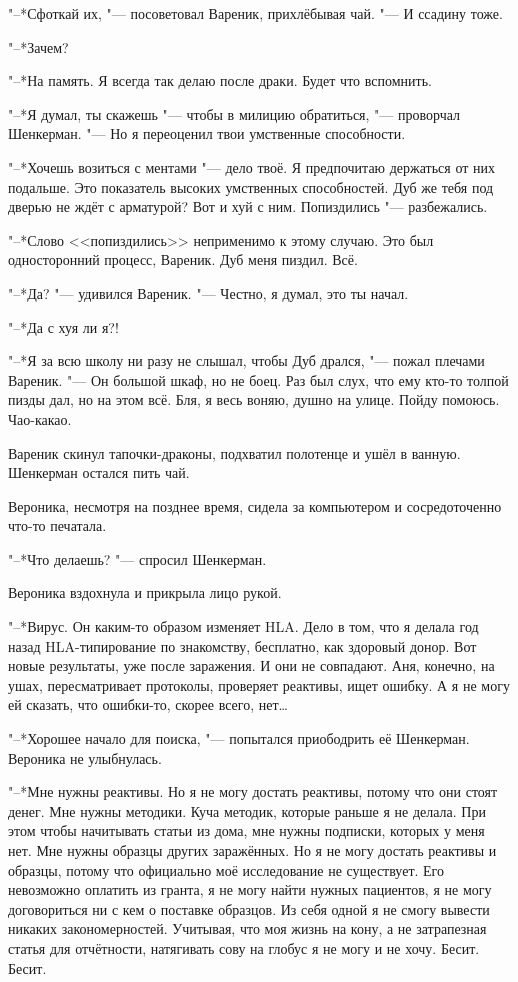 "--*Сфоткай их, "--- посоветовал Вареник, прихлёбывая чай.
"--- И ссадину тоже.

"--*Зачем?

"--*На память.
Я всегда так делаю после драки.
Будет что вспомнить.

"--*Я думал, ты скажешь "--- чтобы в милицию обратиться, "--- проворчал Шенкерман.
"--- Но я переоценил твои умственные способности.

"--*Хочешь возиться с ментами "--- дело твоё.
Я предпочитаю держаться от них подальше.
Это показатель высоких умственных способностей.
Дуб же тебя под дверью не ждёт с арматурой?
Вот и хуй с ним.
Попиздились "--- разбежались.

"--*Слово <<попиздились>> неприменимо к этому случаю.
Это был односторонний процесс, Вареник.
Дуб меня пиздил.
Всё.

"--*Да? "--- удивился Вареник.
"--- Честно, я думал, это ты начал.

"--*Да с хуя ли я?!

"--*Я за всю школу ни разу не слышал, чтобы Дуб дрался, "--- пожал плечами Вареник.
"--- Он большой шкаф, но не боец.
Раз был слух, что ему кто-то толпой пизды дал, но на этом всё.
Бля, я весь воняю, душно на улице.
Пойду помоюсь.
Чао-какао.

Вареник скинул тапочки-драконы, подхватил полотенце и ушёл в ванную.
Шенкерман остался пить чай.

Вероника, несмотря на позднее время, сидела за компьютером и сосредоточенно что-то печатала.

"--*Что делаешь? "--- спросил Шенкерман.

Вероника вздохнула и прикрыла лицо рукой.

"--*Вирус.
Он каким-то образом изменяет HLA.
Дело в том, что я делала год назад HLA-типирование по знакомству, бесплатно, как здоровый донор.
Вот новые результаты, уже после заражения.
И они не совпадают.
Аня, конечно, на ушах, пересматривает протоколы, проверяет реактивы, ищет ошибку.
А я не могу ей сказать, что ошибки-то, скорее всего, нет\ldots{}

"--*Хорошее начало для поиска, "--- попытался приободрить её Шенкерман.
Вероника не улыбнулась.

"--*Мне нужны реактивы.
Но я не могу достать реактивы, потому что они стоят денег.
Мне нужны методики.
Куча методик, которые раньше я не делала.
При этом чтобы начитывать статьи из дома, мне нужны подписки, которых у меня нет.
Мне нужны образцы других заражённых.
Но я не могу достать реактивы и образцы, потому что официально моё исследование не существует.
Его невозможно оплатить из гранта, я не могу найти нужных пациентов, я не могу договориться ни с кем о поставке образцов.
Из себя одной я не смогу вывести никаких закономерностей.
Учитывая, что моя жизнь на кону, а не затрапезная статья для отчётности, натягивать сову на глобус я не могу и не хочу.
Бесит.
Бесит.

